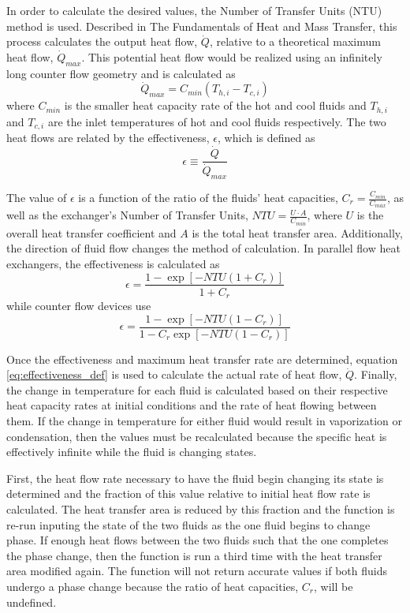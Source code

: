 In order to calculate the desired values, the Number of Transfer Units (NTU) method is used. Described in The Fundamentals of Heat and Mass Transfer, \cite{Incropera} this process calculates the output heat flow, $\dot{Q}$, relative to a theoretical maximum heat flow, $\dot{Q}_{max}$. This potential heat flow would be realized using an infinitely long counter flow geometry and is calculated as
\begin{equation}
\dot{Q}_{max} = C_{min}\left(T_{h,i} - T_{c,i}\right)
\end{equation}
where $C_{min}$ is the smaller heat capacity rate of the hot and cool fluids and $T_{h,i}$ and $T_{c,i}$ are the inlet temperatures of hot and cool fluids respectively. The two heat flows are related by the effectiveness, $\epsilon$, which is defined as 
\begin{equation}
\label{eq:effectiveness_def}
\epsilon \equiv \frac{\dot{Q}}{\dot{Q}_{max}}
\end{equation}

The value of $\epsilon$ is a function of the ratio of the fluids' heat capacities, $C_r = \frac{C_{min}}{C_{max}}$, as well as the exchanger's Number of Transfer Units, $NTU = \frac{U \cdot A}{C_{min}}$, where $U$ is the overall heat transfer coefficient and $A$ is the total heat transfer area. Additionally, the direction of fluid flow changes the method of calculation. In parallel flow heat exchangers, the effectiveness is calculated as
\begin{equation}
\epsilon = \frac{1 - \exp\left[-NTU\left(1 + C_r\right)\right]}{1 + C_r}
\end{equation}
while counter flow devices use
\begin{equation}
\epsilon = \frac{1 - \exp\left[-NTU\left(1 - C_r\right)\right]}{1 - C_r\exp\left[-NTU\left(1 - C_r\right)\right]}
\end{equation}

Once the effectiveness and maximum heat transfer rate are determined, equation \ref{eq:effectiveness_def} is used to calculate the actual rate of heat flow, $\dot{Q}$. Finally, the change in temperature for each fluid is calculated based on their respective heat capacity rates at initial conditions and the rate of heat flowing between them. 
If the change in temperature for either fluid would result in vaporization or condensation, then the values must be recalculated because the specific heat is effectively infinite while the fluid is changing states. 

First, the heat flow rate necessary to have the fluid begin changing its state is determined and the fraction of this value relative to initial heat flow rate is calculated. 
The heat transfer area is reduced by this fraction and the function is re-run inputing the state of the two fluids as the one fluid begins to change phase. If enough heat flows between the two fluids such that the one completes the phase change, then the function is run a third time with the heat transfer area modified again. The function will not return accurate values if both fluids undergo a phase change because the ratio of heat capacities, $C_r$, will be undefined.

